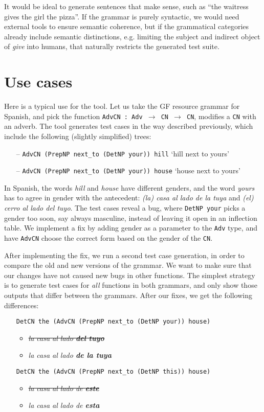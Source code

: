 \documentclass[11pt]{article}
\def\t#1{\texttt{#1}}
\begin{document}
It would be ideal to generate sentences that make sense,
such as ``the waitress gives the girl the pizza''. If the grammar is
purely syntactic, we would need external tools to ensure semantic
coherence, but if the grammatical categories already include semantic
distinctions, e.g. limiting the subject and indirect object of
\emph{give} into humans, that naturally restricts the generated test suite.

\section{Use cases}

Here is a typical use for the tool. 
Let us take the GF resource grammar \cite{ranta2009rgl} for Spanish, and
pick the function \t{AdvCN : Adv $\rightarrow$ CN $\rightarrow$ CN}, modifies a \t{CN} with
an adverb.
The tool generates test cases in the way described previously,
which include the following (slightly simplified) trees: 
\begin{itemize}
\setlength\itemsep{0em}
\item[--] \t{AdvCN (PrepNP next\_to (DetNP your)) hill} `hill next to
yours'
\item[--] \t{AdvCN (PrepNP next\_to (DetNP your)) house} `house next
to yours'
\end{itemize}
In Spanish, the words \emph{hill} and \emph{house} have different
genders, and the word \emph{yours} has to agree in gender 
with the antecedent: \emph{(la) casa al lado de la tuya} and \emph{(el)
  cerro al lado del tuyo}. The test cases reveal a bug, where \t{DetNP your} 
picks a gender too soon, say always masculine, instead of leaving it
open in an inflection table. We implement a fix by adding gender as a
parameter to the \t{Adv} type, and have \t{AdvCN} choose the correct
form based on the gender of the \t{CN}.

After implementing the fix, we run a second test case generation, in
order to compare the old and new versions of the grammar. We want to
make sure that our changes have not caused new bugs in other
functions. The simplest strategy is to generate test cases for
\emph{all} functions in both grammars, and only show those outputs
that differ between the grammars. After our fixes, we get the
following differences:

\begin{itemize}
\setlength\itemsep{0em}
\item[] \t{DetCN the (AdvCN (PrepNP next\_to (DetNP your)) house)}
  \begin{itemize}
   \item \emph{\sout{la casa al lado {\bf  del tuyo}}}
   \item \emph{la casa al lado {\bf  de la tuya}}
  \end{itemize}
\item[] \t{DetCN the (AdvCN (PrepNP next\_to (DetNP this)) house)}
  \begin{itemize}
   \item \emph{\sout{la casa al lado de {\bf este}}}
   \item \emph{la casa al lado de {\bf esta}}
  \end{itemize}
\end{itemize}
\end{document}
